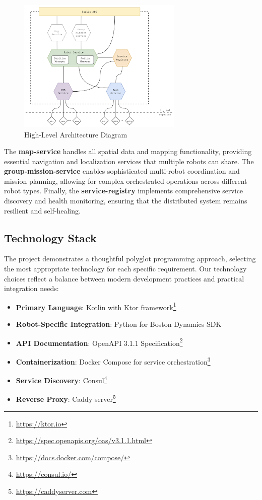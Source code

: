 \documentclass[runningheads]{llncs}
\begin{document}
\begin{figure}[htbp]
    \centering
    \includegraphics[width=0.7\textwidth]{img/harmonikt-architecture.png}
    \caption{High-Level Architecture Diagram}
    \label{fig:architecture}
\end{figure}

The \textbf{map-service} handles all spatial data and mapping functionality, providing essential navigation and localization services that multiple robots can share. The \textbf{group-mission-service} enables sophisticated multi-robot coordination and mission planning, allowing for complex orchestrated operations across different robot types. Finally, the \textbf{service-registry} implements comprehensive service discovery and health monitoring, ensuring that the distributed system remains resilient and self-healing.

\subsection{Technology Stack}

The project demonstrates a thoughtful polyglot programming approach, selecting the most appropriate technology for each specific requirement. Our technology choices reflect a balance between modern development practices and practical integration needs:

\begin{itemize}
    \item \textbf{Primary Language}: Kotlin with Ktor framework\footnote{\url{https://ktor.io}}
    \item \textbf{Robot-Specific Integration}: Python for Boston Dynamics SDK
    \item \textbf{API Documentation}: OpenAPI 3.1.1 Specification\footnote{\url{https://spec.openapis.org/oas/v3.1.1.html}}
    \item \textbf{Containerization}: Docker Compose for service orchestration\footnote{\url{https://docs.docker.com/compose/}}
    \item \textbf{Service Discovery}: Consul\footnote{\url{https://consul.io/}}
    \item \textbf{Reverse Proxy}: Caddy server\footnote{\url{https://caddyserver.com}}
\end{itemize}
\end{document}
